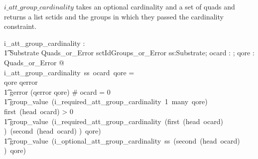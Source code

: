 \documentclass{article}
\begin{document}
$i\_att\_group\_cardinality$ takes an optional cardinality and a set of quads and returns a list sctids and the groups in which they passed the cardinality constraint.

\begin{gendef}
   i\_att\_group\_cardinality : \\
\t1 Substrate \fun \optional[cardinality] \fun Quads\_or\_Error \fun sctIdGroups\_or\_Error
\where
   \forall ss:Substrate; ocard : \optional[cardinality]; qore : Quads\_or\_Error @ \\
   i\_att\_group\_cardinality~ss~ocard~qore = \\
\IF qore \in \ran qerror \THEN \\
\t1 gerror (qerror \inv qore) 
\also
\ELSE \IF \# ocard = 0 \THEN \\
\t1 group\_value~(i\_required\_att\_group\_cardinality~1~many~qore)
\also
\ELSE \IF first~(head~ocard) > 0 \THEN \\
\t1 group\_value~(i\_required\_att\_group\_cardinality~(first~(head~ocard) )~(second~(head~ocard) )~qore)
\also
\ELSE \\
\t1 group\_value~(i\_optional\_att\_group\_cardinality~ss~(second~(head~ocard) )~qore)
\end{gendef}
\end{document}
